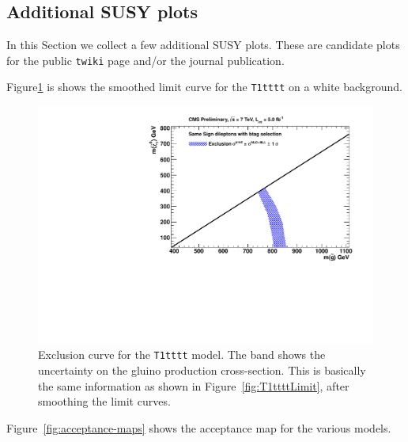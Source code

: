 


\subsection{Additional SUSY plots}
\label{sec:moreSUSYplos}

In this Section we collect a few additional SUSY plots.  These are 
candidate plots for the public {\tt twiki} page and/or the 
journal publication.



Figure\ref{fig:T1ttttLimit2} is shows the smoothed
limit curve for the {\tt T1tttt} on a white background.



\begin{figure}[htb]
\begin{center}
\includegraphics[width=0.49\linewidth]{figs/T1tttt_SmoothLimitsOnWhite.pdf}
\caption{
Exclusion curve for the {\tt T1tttt} model.  The band shows the 
uncertainty on the gluino production cross-section.
This is basically the same information as shown in
Figure~\ref{fig:T1ttttLimit}, after smoothing the limit curves.  
\label{fig:T1ttttLimit2}}
\end{center}
\end{figure}


Figure~\ref{fig:acceptance-maps} shows the acceptance map
for the various models.

